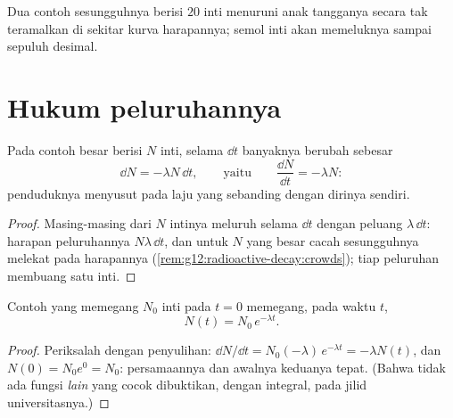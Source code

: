 \begin{omfigure}

{\small Dua contoh sesungguhnya berisi $20$ inti menuruni anak tangganya secara tak
teramalkan di sekitar kurva harapannya; semol inti akan memeluknya sampai sepuluh desimal.}
\end{omfigure}

\section{Hukum peluruhannya}

\begin{proposition}\label{prop:g12:radioactive-decay:ode}
Pada contoh besar berisi $N$ inti, selama $\dd t$ banyaknya berubah sebesar
\[
\dd N = -\lambda N\,\dd t, \qquad\text{yaitu}\qquad \frac{\dd N}{\dd t} = -\lambda N :
\]
penduduknya menyusut pada laju yang sebanding dengan dirinya sendiri.
\end{proposition}

\begin{proof}
Masing-masing dari $N$ intinya meluruh selama $\dd t$ dengan peluang
$\lambda\,\dd t$: harapan peluruhannya $N\lambda\,\dd t$, dan untuk $N$ yang besar
cacah sesungguhnya melekat pada harapannya
(\cref{rem:g12:radioactive-decay:crowds}); tiap peluruhan membuang satu inti.
\end{proof}

\begin{theorem}\label{thm:g12:radioactive-decay:law}
Contoh yang memegang $N_0$ inti pada $t = 0$ memegang, pada waktu $t$,
\[
N(t) = N_0 \, e^{-\lambda t}.
\]
\end{theorem}

\begin{proof}
Periksalah dengan penyulihan:
$\dd N/\dd t = N_0(-\lambda)\,e^{-\lambda t} = -\lambda N(t)$, dan
$N(0) = N_0 e^0 = N_0$: persamaannya dan awalnya keduanya tepat. (Bahwa tidak ada
fungsi \emph{lain} yang cocok dibuktikan, dengan integral, pada jilid
universitasnya.)
\end{proof}


